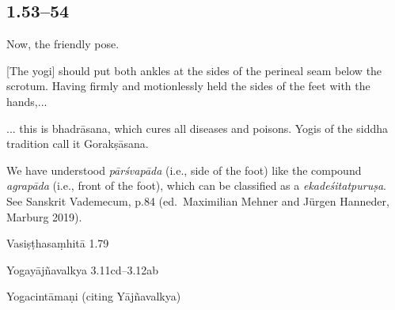 \begin{ekdosis}
\subsection*{1.53--54}
\begin{translation}[hp01_053]
Now, the friendly pose.

[The yogi] should put both ankles at the sides of the perineal seam below the scrotum.  Having firmly and motionlessly held the sides of the feet with the hands,...
\end{translation}

\begin{translation}[hp01_054]
... this is bhadrāsana, which cures all diseases and poisons. Yogis of the siddha tradition call it Gorakṣāsana.
\end{translation}

\begin{philcomm}[hp01_053]
We have understood \emph{pārśvapāda} (i.e., side of the foot) like the compound \emph{agrapāda} (i.e., front of the foot), which can be classified as a \emph{ekadeśitatpuruṣa}. See Sanskrit Vademecum, p.84 (ed.\ Maximilian Mehner and Jürgen Hanneder, Marburg 2019).
\end{philcomm}

\begin{sources}[hp01_053]
Vasiṣṭhasaṃhitā 1.79

\begin{versinnote}
\end{versinnote}

Yogayājñavalkya 3.11cd--3.12ab

\begin{versinnote}
\end{versinnote}

\end{sources}

\begin{testimonia}[hp01_053]
Yogacintāmaṇi (citing Yājñavalkya)


\end{testimonia}
\end{ekdosis}
